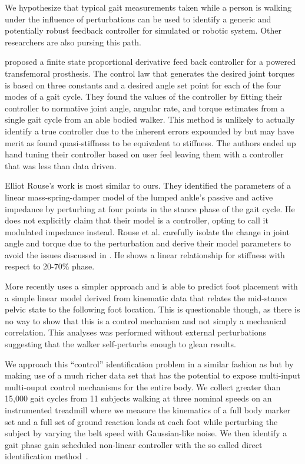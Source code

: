 \documentclass{article}
\begin{document}
We hypothesize that typical gait measurements taken while a person is walking
under the influence of perturbations can be used to identify a generic and
potentially robust feedback controller for simulated or robotic system. Other
researchers are also pursing this path.

\cite{Sup2008} proposed a finite state proportional derivative feed back
controller for a powered transfemoral prosthesis. The control law that
generates the desired joint torques is based on three constants and a desired
angle set point for each of the four modes of a gait cycle. They found the
values of the controller by fitting their controller to normative joint angle,
angular rate, and torque estimates from a single gait cycle from an able bodied
walker. This method is unlikely to actually identify a true controller due
to the inherent errors expounded by \cite{Rouse2013} but may have merit as
\cite{Rouse2014} found quasi-stiffness to be equivalent to stiffness. The
authors ended up hand tuning their controller based on user feel leaving them
with a controller that was less than data driven.


Elliot Rouse's \cite{Rousse2014} work is most similar to ours. They identified
the parameters of a linear mass-spring-damper model of the lumped ankle's
passive and active impedance by perturbing at four points in the stance phase of the gait
cycle. He does not explicitly claim that their model is a controller, opting
to call it modulated impedance instead. Rouse et al. carefully isolate the
change in joint angle and torque due to the perturbation and derive their model
parameters to avoid the issues discussed in \cite{Rouse2013}. He shows a linear
relationship for stiffness with respect to 20-70\% phase.

More recently \cite{Wang2014} uses a simpler approach and is able to predict
foot placement with a simple linear model derived from kinematic data that
relates the mid-stance pelvic state to the following foot location. This is
questionable though, as there is no way to show that this is a control mechanism
and not simply a mechanical correlation. This analyses was performed without
external perturbations suggesting that the walker self-perturbs enough to glean
results.

We approach this ``control'' identification problem in a similar fashion as
\cite{Rouse2014} but by making use of a much richer data set that has the
potential to expose multi-input multi-ouput control mechanisms for the entire
body. We collect greater than 15,000 gait cycles from 11 subjects walking at
three nominal speeds on an instrumented treadmill where we measure the
kinematics of a full body marker set and a full set of ground reaction loads at
each foot while perturbing the subject by varying the belt speed with
Gaussian-like noise. We then identify a gait phase gain scheduled non-linear
controller with the so called direct identification method~\cite{Ljung1999}.
\end{document}
